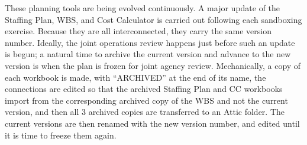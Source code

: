 These planning tools are being evolved continuously.
A major update of the Staffing Plan, WBS, and Cost Calculator is carried out following each sandboxing exercise.
Because they are all interconnected, they carry the same version number.
Ideally, the joint operations review happens just before such an update is begun; a natural time to archive the current version and advance to the new version is when the plan is frozen for joint agency review.
Mechanically, a copy of each workbook is made, with ``ARCHIVED'' at the end of its name, the connections are edited so that the archived Staffing Plan and CC workbooks import from the corresponding archived copy of the WBS and not the current version, and then all 3 archived copies are transferred to an Attic folder.
The current versions are then renamed with the new version number, and edited until it is time to freeze them again.
